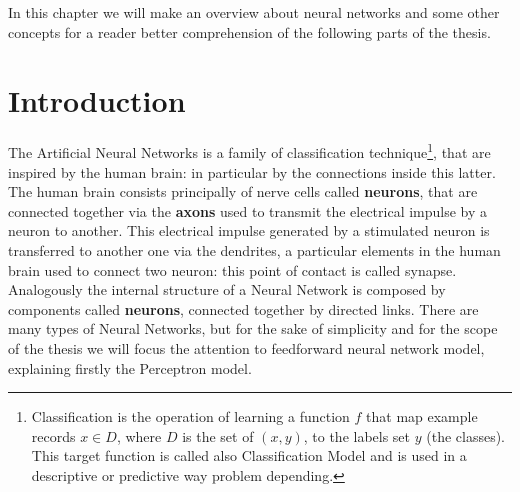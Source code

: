 \label{sl-nn}
In this chapter we will make an overview about neural networks and some other concepts for a reader better comprehension of the following parts of the thesis.

\section{Introduction}
The Artificial Neural Networks is a family of classification technique\footnote{Classification is the operation of learning a function \textbf{$f$} that map example records \textbf{$x \in D$}, where $D$ is the set of \textbf{$(x, y)$}, to the labels set \textbf{$y$} (the classes). This target function is called also Classification Model and is used in a descriptive or predictive way problem depending.}, that are inspired by the human brain: in particular by the connections inside this latter. The human brain consists principally of nerve cells called \textbf{neurons}, that are connected together via the \textbf{axons} used to transmit the electrical impulse by a neuron to another. This electrical impulse generated by a stimulated neuron is transferred to another one via the dendrites, a particular elements in the human brain used to connect two neuron: this point of contact is called synapse. \newline Analogously the internal structure of a Neural Network is composed by components called \textbf{neurons}, connected together by directed links. There are many types of Neural Networks, but for the sake of simplicity and  for the scope of the thesis we will focus the attention to feedforward neural network model, explaining firstly the Perceptron model.

